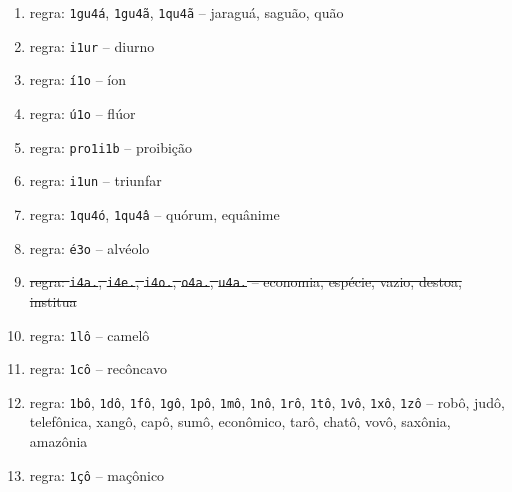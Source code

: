 \documentclass{article}
\begin{document}
\begin{enumerate}
\item\label{rulegrp_gua} regra: \texttt{1gu4á}, \texttt{1gu4ã}, \texttt{1qu4ã} -- jaraguá, saguão, quão

\item\label{rulegrp_iur} regra: \texttt{i1ur} -- diurno

\item\label{rulegrp_io} regra: \texttt{í1o} -- íon

\item\label{rulegrp_uo} regra: \texttt{ú1o} -- flúor

\item\label{rulegrp_proi} regra: \texttt{pro1i1b} -- proibição

\item\label{rulegrp_iun} regra: \texttt{i1un} -- triunfar

\item\label{rulegrp_quo} regra: \texttt{1qu4ó}, \texttt{1qu4â} -- quórum, equânime

\item\label{rulegrp_eo} regra: \texttt{é3o} -- alvéolo

\item\label{rulegrp_ia} \st{regra: \texttt{i4a.}, \texttt{i4e.}, \texttt{i4o.}, \texttt{o4a.}, \texttt{u4a.} -- economia, espécie, vazio, destoa, institua}

\item\label{rulegrp_lo} regra: \texttt{1lô} -- camelô

\item\label{rulegrp_co} regra: \texttt{1cô} -- recôncavo

\item\label{rulegrp_bo} regra: \texttt{1bô}, \texttt{1dô}, \texttt{1fô}, \texttt{1gô}, \texttt{1pô}, \texttt{1mô}, \texttt{1nô}, \texttt{1rô}, \texttt{1tô}, \texttt{1vô}, \texttt{1xô}, \texttt{1zô} -- robô, judô,  telefônica, xangô, capô, sumô, econômico, tarô, chatô, vovô, saxônia, amazônia

\item\label{rulegrp_cco} regra: \texttt{1çô} -- maçônico

    \setcounter{numberRulesGroups}{\value{enumi}}
\end{enumerate}
\end{document}

